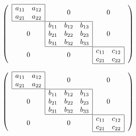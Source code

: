 \documentclass[dvips,a4paper,english]{article}
\begin{document}
\begin{LTXexample}[pos=l]
\begin{dogrid}
\[ \left(
\begin{array}{c@{}c@{}c}
\begin{array}{|cc|}\hline
a_{11} & a_{12} \\
a_{21} & a_{22} \\\hline
\end{array} & 0 & 0 \\
0 & \begin{array}{|ccc|}\hline
    b_{11} & b_{12} & b_{13}\\
    b_{21} & b_{22} & b_{23}\\
    b_{31} & b_{32} & b_{33}\\\hline
    \end{array} & 0 \\
0 & 0 & \begin{array}{|cc|}\hline
        c_{11} & c_{12} \\
        c_{21} & c_{22} \\\hline
        \end{array} \\
\end{array}\right)\]
\end{dogrid}
\end{LTXexample}

\begin{LTXexample}[pos=l]
\begin{dogrid}[][Gtrim=-1 0]
\[ \left(
\begin{array}{c@{}c@{}c}
\begin{array}{|cc|}\hline
a_{11} & a_{12} \\
a_{21} & a_{22} \\\hline
\end{array} & 0 & 0 \\
0 & \begin{array}{|ccc|}\hline
    b_{11} & b_{12} & b_{13}\\
    b_{21} & b_{22} & b_{23}\\
    b_{31} & b_{32} & b_{33}\\\hline
    \end{array} & 0 \\
0 & 0 & \begin{array}{|cc|}\hline
        c_{11} & c_{12} \\
        c_{21} & c_{22} \\\hline
        \end{array} \\
\end{array}\right)\]
\end{dogrid}
\end{LTXexample}
\end{document}
